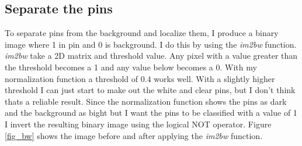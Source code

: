 \documentclass[12pt]{article}
\begin{document}
\subsection{Separate the pins}

To separate pins from the background and localize them, I produce a binary image where 1 in pin and 0 is background. I do this by using the \textit{im2bw} function. \textit{im2bw} take a 2D matrix and threshold value. Any pixel with a value greater than the threshold becomes a 1 and any value below becomes a 0. With my normalization function a threshold of ${0.4}$ works well. With a slightly higher threshold I can just start to make out the white and clear pins, but I don't think thats a reliable result. Since the normalization function shows the pins as dark and the background as bight but I want the pins to be classified with a value of 1 I invert the resulting binary image using the logical NOT operator. Figure \ref{fig_bw} shows the image before and after applying the \textit{im2bw} function.
\end{document}
